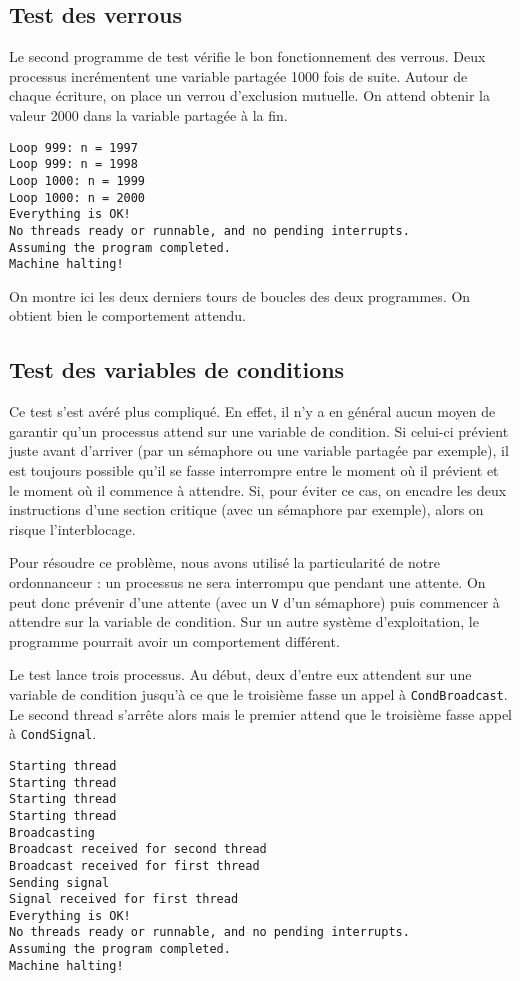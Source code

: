 \documentclass{article}
\def\fun#1{\texttt{#1}}
\begin{document}
\subsection{Test des verrous}
Le second programme de test vérifie le bon fonctionnement des verrous. Deux processus incrémentent une variable partagée 1000 fois de suite. Autour de chaque écriture, on place un verrou d'exclusion mutuelle. On attend obtenir la valeur 2000 dans la variable partagée à la fin.

\begin{lstlisting}
Loop 999: n = 1997
Loop 999: n = 1998
Loop 1000: n = 1999
Loop 1000: n = 2000
Everything is OK!
No threads ready or runnable, and no pending interrupts.
Assuming the program completed.
Machine halting!
\end{lstlisting}

On montre ici les deux derniers tours de boucles des deux programmes. On obtient bien le comportement attendu.


\subsection{Test des variables de conditions}
Ce test s'est avéré plus compliqué.
En effet, il n'y a en général aucun moyen de garantir qu'un processus attend sur une variable de condition. Si celui-ci prévient juste avant d'arriver (par un sémaphore ou une variable partagée par exemple), il est toujours possible qu'il se fasse interrompre entre le moment où il prévient et le moment où il commence à attendre. Si, pour éviter ce cas, on encadre les deux instructions d'une section critique (avec un sémaphore par exemple), alors on risque l'interblocage.

Pour résoudre ce problème, nous avons utilisé la particularité de notre ordonnanceur : un processus ne sera interrompu que pendant une attente. On peut donc prévenir d'une attente (avec un \fun{V} d'un sémaphore) puis commencer à attendre sur la variable de condition. Sur un autre système d'exploitation, le programme pourrait avoir un comportement différent.

Le test lance trois processus. Au début, deux d'entre eux attendent sur une variable de condition jusqu'à ce que le troisième fasse un appel à \fun{CondBroadcast}. Le second thread s'arrête alors mais le premier attend que le troisième fasse appel à \fun{CondSignal}. 

\begin{lstlisting}
Starting thread
Starting thread
Starting thread
Starting thread
Broadcasting
Broadcast received for second thread
Broadcast received for first thread
Sending signal
Signal received for first thread
Everything is OK!
No threads ready or runnable, and no pending interrupts.
Assuming the program completed.
Machine halting!
\end{lstlisting}
\end{document}
